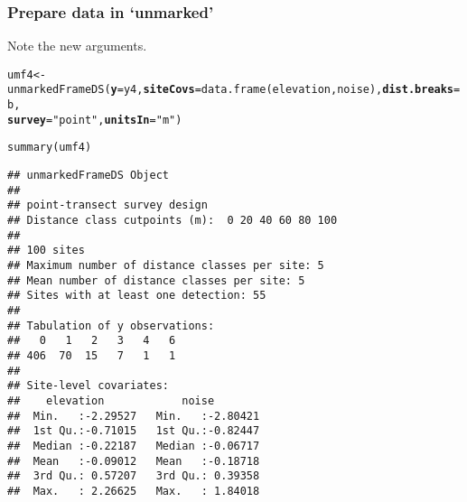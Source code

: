 \documentclass[color=usenames,dvipsnames]{beamer}\usepackage[]{graphicx}\usepackage[]{color}
\makeatletter
\newcommand{\hlstr}[1]{\textcolor[rgb]{0.749,0.012,0.012}{#1}}%
\newcommand{\hlstd}[1]{\textcolor[rgb]{0,0,0}{#1}}%
\newcommand{\hlkwb}[1]{\textcolor[rgb]{0,0.341,0.682}{#1}}%
\newcommand{\hlkwc}[1]{\textcolor[rgb]{0,0,0}{\textbf{#1}}}%
\newcommand{\hlkwd}[1]{\textcolor[rgb]{0.004,0.004,0.506}{#1}}%
\newenvironment{kframe}{%
 \def\at@end@of@kframe{}%
 \ifinner\ifhmode%
  \def\at@end@of@kframe{\end{minipage}}%
  \begin{minipage}{\columnwidth}%
 \fi\fi%
 \def\FrameCommand##1{\hskip\@totalleftmargin \hskip-\fboxsep
 \colorbox{shadecolor}{##1}\hskip-\fboxsep
     \hskip-\linewidth \hskip-\@totalleftmargin \hskip\columnwidth}%
 \MakeFramed {\advance\hsize-\width
   \@totalleftmargin\z@ \linewidth\hsize
   \@setminipage}}%
 {\par\unskip\endMakeFramed%
 \at@end@of@kframe}
\newenvironment{knitrout}{}{} %
\makeatother
\begin{document}
\begin{frame}[fragile]
  \frametitle{Prepare data in `unmarked'}
  \small
  Note the new arguments.
  \vspace{-6pt}
\begin{knitrout}\tiny
{}\color{fgcolor}\begin{kframe}
\begin{alltt}
\hlstd{umf4} \hlkwb{<-} \hlkwd{unmarkedFrameDS}\hlstd{(}\hlkwc{y}\hlstd{=y4,} \hlkwc{siteCovs}\hlstd{=}\hlkwd{data.frame}\hlstd{(elevation,noise),} \hlkwc{dist.breaks}\hlstd{=b,}
                       \hlkwc{survey}\hlstd{=}\hlstr{"point"}\hlstd{,} \hlkwc{unitsIn}\hlstd{=}\hlstr{"m"}\hlstd{)}
\end{alltt}
\end{kframe}
\end{knitrout}
\pause
\begin{knitrout}\tiny
{}\color{fgcolor}\begin{kframe}
\begin{alltt}
\hlkwd{summary}\hlstd{(umf4)}
\end{alltt}
\begin{verbatim}
## unmarkedFrameDS Object
## 
## point-transect survey design
## Distance class cutpoints (m):  0 20 40 60 80 100 
## 
## 100 sites
## Maximum number of distance classes per site: 5 
## Mean number of distance classes per site: 5 
## Sites with at least one detection: 55 
## 
## Tabulation of y observations:
##   0   1   2   3   4   6 
## 406  70  15   7   1   1 
## 
## Site-level covariates:
##    elevation            noise         
##  Min.   :-2.29527   Min.   :-2.80421  
##  1st Qu.:-0.71015   1st Qu.:-0.82447  
##  Median :-0.22187   Median :-0.06717  
##  Mean   :-0.09012   Mean   :-0.18718  
##  3rd Qu.: 0.57207   3rd Qu.: 0.39358  
##  Max.   : 2.26625   Max.   : 1.84018
\end{verbatim}
\end{kframe}
\end{knitrout}
\end{frame}
\end{document}

